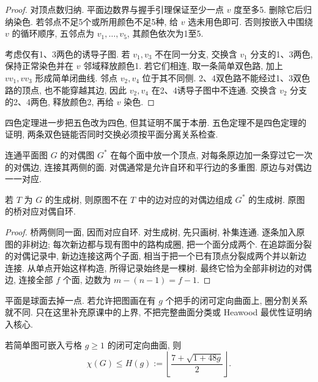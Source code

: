 \begin{proof}
对顶点数归纳. 平面边数界与握手引理保证至少一点 $v$ 度至多5. 删除它后归纳染色. 若邻点不足5个或所用颜色不足5种, 给 $v$ 选未用色即可. 否则按嵌入中围绕 $v$ 的循环顺序, 五邻点为 $v_1,\ldots,v_5$, 其颜色依次为1至5.

考虑仅有1、3两色的诱导子图. 若 $v_1,v_3$ 不在同一分支, 交换含 $v_1$ 分支的1、3两色, 保持正常染色并在 $v$ 邻域释放颜色1. 若它们相连, 取一条简单双色路, 加上 $vv_1,vv_3$ 形成简单闭曲线. 邻点 $v_2,v_4$ 位于其不同侧. 2、4双色路不能经过1、3双色路的顶点, 也不能穿越其边, 因此 $v_2,v_4$ 在2、4诱导子图中不连通. 交换含 $v_2$ 分支的2、4两色, 释放颜色2, 再给 $v$ 染色.
\end{proof}
四色定理进一步把五色改为四色, 但其证明不属于本册. 五色定理不是四色定理的证明, 两条双色链能否同时交换必须按平面分离关系检查.
\begin{center}
\end{center}
\begin{definition}
连通平面图 $G$ 的对偶图 $G^*$ 在每个面中放一个顶点, 对每条原边加一条穿过它一次的对偶边, 连接其两侧的面. 对偶通常是允许自环和平行边的多重图. 原边与对偶边一一对应.
\end{definition}
\begin{proposition}\label{prop:dual-tree}
若 $T$ 为 $G$ 的生成树, 则原图不在 $T$ 中的边对应的对偶边组成 $G^*$ 的生成树. 原图的桥对应对偶自环.
\end{proposition}
\begin{proof}
桥两侧同一面, 因而对应自环. 对生成树, 先只画树, 补集连通. 逐条加入原图的非树边; 每次新边都与现有图中的路构成圈, 把一个面分成两个. 在追踪面分裂的对偶记录中, 新边连接这两个子面, 相当于把一个已有顶点分裂成两个并以新边连接. 从单点开始这样构造, 所得记录始终是一棵树. 最终它恰为全部非树边的对偶边, 连接全部 $f$ 个面, 边数为 $m-(n-1)=f-1$.
\end{proof}
平面是球面去掉一点. 若允许把图画在有 $g$ 个把手的闭可定向曲面上, 圈分割关系就不同. 只在这里补充原课中的上界, 不把完整曲面分类或 Heawood 最优性证明纳入核心.
\begin{proposition}
若简单图可嵌入亏格 $g\ge1$ 的闭可定向曲面, 则
\[
\chi(G)\le H(g):=\left\lfloor\frac{7+\sqrt{1+48g}}2\right\rfloor.
\]
\end{proposition}
